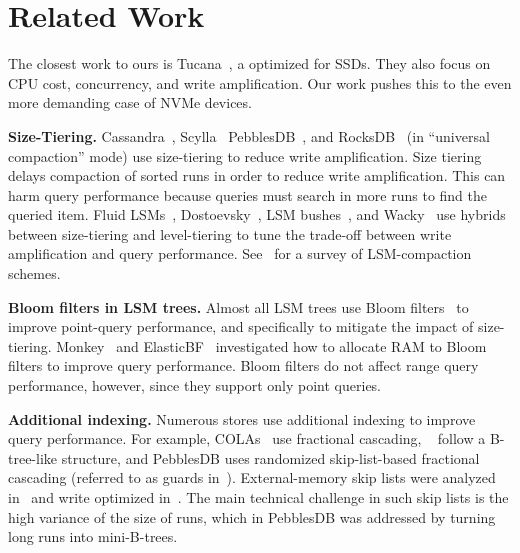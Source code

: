 \section{Related Work}
\label{sec:related}

The closest work to ours is Tucana~\cite{DBLP:conf/usenix/PapagiannisSGB16}, a
\bet optimized for SSDs.  They also focus on CPU cost, concurrency, and write
amplification.  Our work pushes this to the even more demanding case of NVMe
devices.  

\textbf{Size-Tiering.}  Cassandra~\cite{cassandra}, Scylla~\cite{scylla}
PebblesDB~\cite{DBLP:conf/sosp/RajuKCA17}, and
RocksDB~\cite{facebook-rocksdb2018} (in ``universal compaction'' mode) use
size-tiering to reduce write amplification.  Size tiering delays compaction of
sorted runs in order to reduce write amplification.  This can harm query
performance because queries must search in more runs to find the queried item.
Fluid LSMs~\cite{DBLP:conf/sigmod/DayanI18},
Dostoevsky~\cite{DBLP:conf/sigmod/DayanI18}, LSM
bushes~\cite{DBLP:conf/sigmod/DayanI19}, and
Wacky~\cite{DBLP:conf/sigmod/DayanI19} use hybrids between size-tiering and
level-tiering to tune the trade-off between write amplification and query
performance.  See~\cite{DBLP:conf/sosp/RajuKCA17} for a survey of
LSM-compaction schemes.

\textbf{Bloom filters in LSM trees.}  Almost all LSM trees use Bloom
filters~\cite{DBLP:journals/cacm/Bloom70} to improve point-query performance,
and specifically to mitigate the impact of size-tiering.
Monkey~\cite{DBLP:conf/sigmod/DayanAI17} and
ElasticBF~\cite{DBLP:conf/usenix/LiTGLX19} investigated how to allocate RAM to
Bloom filters to improve query performance.  Bloom filters do not affect range
query performance, however, since they support only point queries.

\textbf{Additional indexing.}  Numerous \kv stores use additional indexing to
improve query performance.  For example,
COLAs~\cite{DBLP:conf/spaa/BenderFFFKN07} use fractional cascading,
\bets~\cite{DBLP:conf/soda/BrodalF03} follow a B-tree-like structure, and
PebblesDB uses randomized skip-list-based fractional cascading (referred to as
guards in~\cite{DBLP:conf/sosp/RajuKCA17}).  External-memory skip lists were
analyzed in~\cite{DBLP:conf/pods/BenderBJKMPSSZ16:set} and write optimized
in~\cite{DBLP:conf/pods/BenderFJMMPX17}.  The main technical challenge in such
skip lists is the high variance of the size of runs, which in PebblesDB was
addressed by turning long runs into mini-B-trees.

